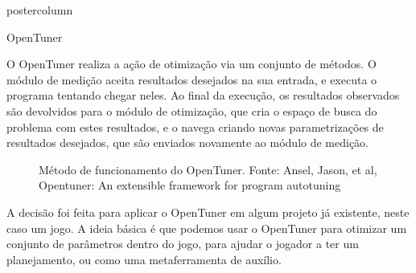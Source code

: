 \documentclass[final]{beamer}
\begin{document}
\begin{frame}
\begin{columns}
\begin{column}{.5\textwidth}
\begin{beamercolorbox}[center,wd=\textwidth]{postercolumn}
\begin{minipage}[T]{.95\textwidth}
{\begin{block}{OpenTuner}
                \vspace*{0.2cm}
                
                O OpenTuner realiza a ação de otimização via um conjunto de métodos. O módulo de medição aceita resultados desejados na sua entrada, e executa o programa tentando chegar neles. Ao final da execução, os resultados observados são devolvidos para o módulo de otimização, que cria o espaço de busca do problema com estes resultados, e o navega criando novas parametrizações de resultados desejados, que são enviados novamente ao módulo de medição.
                
                \vspace*{0.4cm} 
                
                
                \begin{figure}[h]
                  \caption{Método de funcionamento do OpenTuner.
                    Fonte: Ansel, Jason, et al, Opentuner: An extensible framework for program autotuning}
                \end{figure}
                
                \vspace*{0.2cm} 
                
                A decisão foi feita para aplicar o OpenTuner em algum projeto já existente, neste caso um jogo. A ideia básica é que podemos usar o OpenTuner para otimizar um conjunto de parâmetros dentro do jogo, para ajudar o jogador a ter um planejamento, ou como uma metaferramenta de auxílio.
                               
                \vspace*{0.2cm} 
            \end{block}
                        
            \vspace*{0.2cm}
          }
        \end{minipage}
      \end{beamercolorbox}
    \end{column}


\end{columns}
\end{frame}
\end{document}
